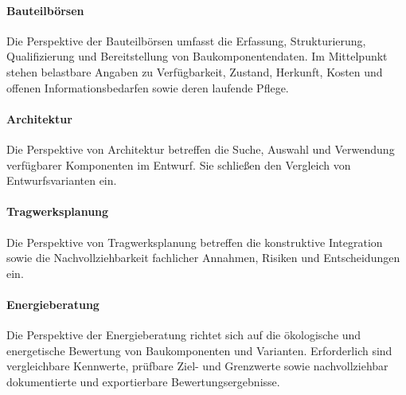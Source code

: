 \documentclass[type=zwischenbericht]{zukunftbau}
\begin{document}
\begin{SemioNest}
\paragraph{Bauteilbörsen}
Die Perspektive der Bauteilbörsen umfasst die Erfassung, Strukturierung, Qualifizierung und Bereitstellung von Baukomponentendaten. Im Mittelpunkt stehen belastbare Angaben zu Verfügbarkeit, Zustand, Herkunft, Kosten und offenen Informationsbedarfen sowie deren laufende Pflege.

\paragraph{Architektur}
Die Perspektive von Architektur betreffen die Suche, Auswahl und Verwendung verfügbarer Komponenten im Entwurf. Sie schließen den Vergleich von Entwurfsvarianten ein.

\paragraph{Tragwerksplanung}
Die Perspektive von Tragwerksplanung betreffen die konstruktive Integration sowie die Nachvollziehbarkeit fachlicher Annahmen, Risiken und Entscheidungen ein.

\paragraph{Energieberatung}
Die Perspektive der Energieberatung richtet sich auf die ökologische und energetische Bewertung von Baukomponenten und Varianten. Erforderlich sind vergleichbare Kennwerte, prüfbare Ziel- und Grenzwerte sowie nachvollziehbar dokumentierte und exportierbare Bewertungsergebnisse.
\end{SemioNest}
\end{document}
